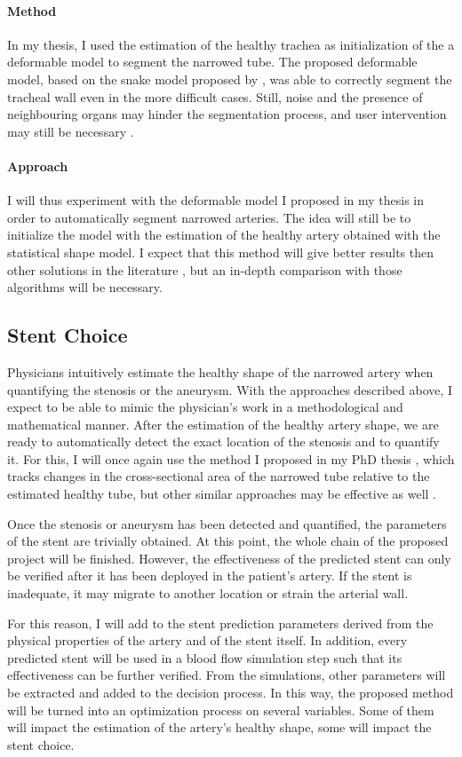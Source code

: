 \documentclass[a4paper]{article}
\newcommand{\method}{\paragraph{Method}}
\newcommand{\approach}{\paragraph{Approach}}
\begin{document}
\method 
In my thesis, I used the estimation of the healthy trachea as initialization of the a deformable model to segment the narrowed tube. The proposed deformable model, based on the snake model proposed by \cite{Kass}, was able to correctly segment the tracheal wall even in the more difficult cases. Still, noise and the presence of neighbouring organs may hinder the segmentation process, and user intervention may still be necessary \citep{Pinho:Trachea7}.

\approach
I will thus experiment with the deformable model I proposed in my thesis in order to automatically segment narrowed arteries. The idea will still be to initialize the model with the estimation of the healthy artery obtained with the statistical shape model. I expect that this method will give better results then other solutions in the literature \citep{CARR-07,Florez2,Antiga,Bemmel}, but an in-depth comparison with those algorithms will be necessary.

\subsection{Stent Choice}

Physicians intuitively estimate the healthy shape of the narrowed artery when quantifying the stenosis or the aneurysm. With the approaches described above, I expect to be able to mimic the physician's work in a methodological and mathematical manner. After the estimation of the healthy artery shape, we are ready to automatically detect the exact location of the stenosis and to quantify it. For this, I will once again use the method I proposed in my PhD thesis \citep{Pinho:Trachea4}, which tracks changes in the cross-sectional area of the narrowed tube relative to the estimated healthy tube, but other similar approaches may be effective as well \citep{Florez2}.

Once the stenosis or aneurysm has been detected and quantified, the parameters of the stent are trivially obtained. At this point, the whole chain of the proposed project will be finished. However, the effectiveness of the predicted stent can only be verified after it has been deployed in the patient's artery. If the stent is inadequate, it may migrate to another location or strain the arterial wall. 

For this reason, I will add to the stent prediction parameters derived from the physical properties of the artery and of the stent itself. In addition, every predicted stent will be used in a blood flow simulation step such that its effectiveness can be further verified. From the simulations, other parameters will be extracted and added to the decision process. In this way, the proposed method will be turned into an optimization process on several variables. Some of them will impact the estimation of the artery's healthy shape, some will impact the stent choice.
\end{document}
